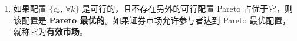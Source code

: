 \begin{tcolorbox}[knowledge,title=2.7 本章小结]
\begin{enumerate}
    \item 如果配置 $\{c_k,\,\forall k\}$ 是可行的，且不存在另外的可行配置 Pareto 占优于它，则该配置是 \textbf{Pareto 最优的}。如果证券市场允许参与者达到 Pareto 最优配置，就称它为\textbf{有效市场}。
\end{enumerate}
\end{tcolorbox}
\fi


